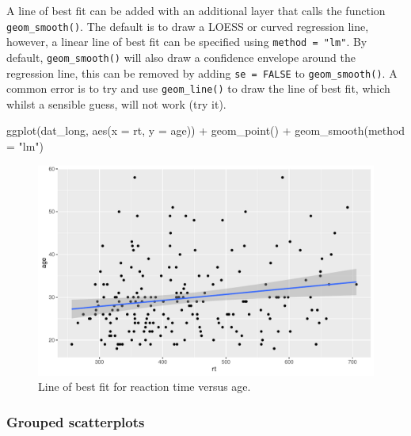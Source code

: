\documentclass[
  english,
  doc,floatsintext]{apa6}
\newenvironment{Shaded}{\begin{snugshade}}{\end{snugshade}}
\newcommand{\AttributeTok}[1]{\textcolor[rgb]{0.77,0.63,0.00}{#1}}
\newcommand{\FunctionTok}[1]{\textcolor[rgb]{0.00,0.00,0.00}{#1}}
\newcommand{\NormalTok}[1]{#1}
\newcommand{\SpecialCharTok}[1]{\textcolor[rgb]{0.00,0.00,0.00}{#1}}
\newcommand{\StringTok}[1]{\textcolor[rgb]{0.31,0.60,0.02}{#1}}
\begin{document}
A line of best fit can be added with an additional layer that calls the function \texttt{geom\_smooth()}. The default is to draw a LOESS or curved regression line, however, a linear line of best fit can be specified using \texttt{method\ =\ "lm"}. By default, \texttt{geom\_smooth()} will also draw a confidence envelope around the regression line, this can be removed by adding \texttt{se\ =\ FALSE} to \texttt{geom\_smooth()}. A common error is to try and use \texttt{geom\_line()} to draw the line of best fit, which whilst a sensible guess, will not work (try it).

\begin{Shaded}
\begin{Highlighting}[]
\FunctionTok{ggplot}\NormalTok{(dat\_long, }\FunctionTok{aes}\NormalTok{(}\AttributeTok{x =}\NormalTok{ rt, }\AttributeTok{y =}\NormalTok{ age)) }\SpecialCharTok{+}
  \FunctionTok{geom\_point}\NormalTok{() }\SpecialCharTok{+}
  \FunctionTok{geom\_smooth}\NormalTok{(}\AttributeTok{method =} \StringTok{"lm"}\NormalTok{)}
\end{Highlighting}
\end{Shaded}

\begin{figure}

{\centering \includegraphics[width=1\linewidth]{images/smooth-plot-1} 

}

\caption{Line of best fit for reaction time versus age.}\label{fig:smooth-plot}
\end{figure}

\hypertarget{grouped-scatterplots}{%
\subsubsection{Grouped scatterplots}\label{grouped-scatterplots}}
\end{document}
